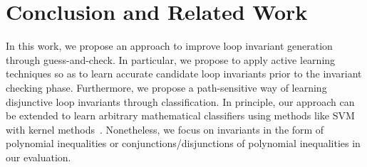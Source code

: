 
\section{Conclusion and Related Work} %
\label{sec:related}
In this work, we propose an approach to improve loop invariant generation through guess-and-check. In particular, we propose to apply active learning techniques so as to learn accurate candidate loop invariants prior to the invariant checking phase. Furthermore, we propose a path-sensitive way of learning disjunctive loop invariants through classification. In principle, our approach can be extended to learn arbitrary mathematical classifiers using methods like SVM with kernel methods~\cite{svm:kernel}.
Nonetheless, %
we focus on invariants in the form of polynomial inequalities or conjunctions/disjunctions of polynomial inequalities in our evaluation.



